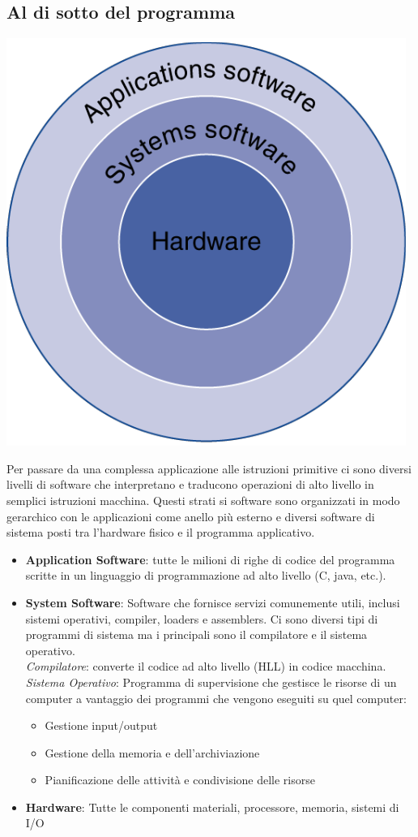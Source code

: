 \documentclass[12pt,a4paper]{article}
\begin{document}
\subsection{Al di sotto del programma}
\begin{center}
\includegraphics[width=0.4\columnwidth]{img/programma.png}
\end{center}
Per passare da una complessa applicazione alle istruzioni primitive ci sono diversi livelli di software che interpretano e traducono operazioni di alto livello in semplici istruzioni macchina. Questi strati si software sono organizzati in modo gerarchico con le applicazioni come anello più esterno e diversi software di sistema posti tra l'hardware fisico e il programma applicativo.
\begin{itemize}
\item \textbf{Application Software}: tutte le milioni di righe di codice del programma scritte in un linguaggio di programmazione ad alto livello (C, java, etc.).
\item \textbf{System Software}: Software che fornisce servizi comunemente utili, inclusi sistemi operativi, compiler, loaders e assemblers. Ci sono diversi tipi di programmi di sistema ma i principali sono il compilatore e il sistema operativo.\\
\textsl{Compilatore}: converte il codice ad alto livello (HLL) in codice macchina.\\
\textsl{Sistema Operativo}: Programma di supervisione che gestisce le risorse di un computer a vantaggio dei programmi che vengono eseguiti su quel computer:
\begin{itemize}
\item Gestione input/output
\item Gestione della memoria e dell'archiviazione
\item Pianificazione delle attività e condivisione delle risorse
\end{itemize}
\item \textbf{Hardware}: Tutte le componenti materiali, processore, memoria, sistemi di I/O
\end{itemize}
\end{document}
